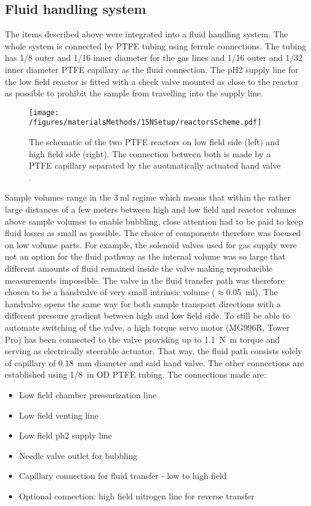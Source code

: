         \subsection{Fluid handling system}
        The items described above were integrated into a fluid handling system. The whole system is connected by PTFE tubing  using ferrule connections. The tubing has \SI{1/8}{\in} outer and \SI{1/16}{\in} inner diameter for the gas lines and \SI{1/16}{\in} outer and \SI{1/32}{\in} inner diameter PTFE capillary as the fluid connection. The pH2 supply line for the low field reactor is fitted with a check valve mounted as close to the reactor as possible to prohibit the sample from travelling into the supply line.
            \begin{figure}
                \texttt{[image: /figures/materialsMethods/15NSetup/reactorsScheme.pdf]}
                \caption[Reactor schematics]{The schematic of the two PTFE reactors on low field side (left) and high field side (right). The connection between both is made by a PTFE capillary separated by the auotmatically actuated hand valve . }
            \end{figure}
            Sample volumes range in the $\SI{3}{\milli\litre}$ regime which means that within the rather large distances of a few meters between high and low field and reactor volumes above sample volumes to enable bubbling, close attention had to be paid to keep fluid losses as small as possible.  The choice of components therefore was focused on low volume parts.  For example, the solenoid valves used for gas supply were not an option for the fluid pathway as the internal volume was so large that different amounts of fluid remained inside the valve making reproducible measurements impossible.  The valve in the fluid transfer path was therefore chosen to be a handvalve of very small intrinsic volume ($\approx$\SI{0.05}{\ml}). The handvalve opens the same way for both sample transport directions with a different pressure gradient between high and low field side. To still be able to automate switching of the valve, a high torque servo motor (MG996R, Tower Pro) has been connected to the valve providing up to \SI{1.1}{\newton\m} torque and serving as electrically steerable actuator. That way, the fluid path consists solely of capillary of \SI{0.18}{\mm} diameter and said hand valve. The other connections are established using \SI{1/8}{in} OD PTFE tubing.  The connections made are:
            \begin{itemize}
                \setlength{\itemsep}{-2pt}
                \item Low field chamber pressurization line
                \item Low field venting line
                \item Low field ph2 supply line
                \item Needle valve outlet for bubbling
                \item Capillary connection for fluid transfer - low to high field
                \item Optional connection: high field nitrogen line for reverse transfer
            \end{itemize}
